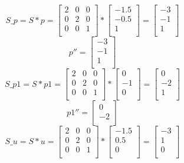 \documentclass{article}
\begin{document}
\[
    S\_p = S * p =
    \begin{bmatrix}
        2 & 0 & 0 \\
        0 & 2 & 0 \\
        0 & 0 & 1 \\
    \end{bmatrix}
    *
    \begin{bmatrix}
        -1.5 \\
        -0.5 \\
        1    \\
    \end{bmatrix}
    =
    \begin{bmatrix}
        -3 \\
        -1 \\
        1  \\
    \end{bmatrix}
\]
\[
    p'' =
    \begin{bmatrix}
        -3 \\
        -1 \\
        1  \\
    \end{bmatrix}
\]
\[
    S\_p1 = S * p1 =
    \begin{bmatrix}
        2 & 0 & 0 \\
        0 & 2 & 0 \\
        0 & 0 & 1 \\
    \end{bmatrix}
    *
    \begin{bmatrix}
        0  \\
        -1 \\
        0  \\
    \end{bmatrix}
    =
    \begin{bmatrix}
        0  \\
        -2 \\
        1  \\
    \end{bmatrix}
\]
\[
    p1'' =
    \begin{bmatrix}
        0  \\
        -2 \\
    \end{bmatrix}
\]
\[
    S\_u = S * u =
    \begin{bmatrix}
        2 & 0 & 0 \\
        0 & 2 & 0 \\
        0 & 0 & 1 \\
    \end{bmatrix}
    *
    \begin{bmatrix}
        -1.5 \\
        0.5  \\
        0    \\
    \end{bmatrix}
    =
    \begin{bmatrix}
        -3 \\
        1  \\
        0  \\
    \end{bmatrix}
\]
\end{document}
